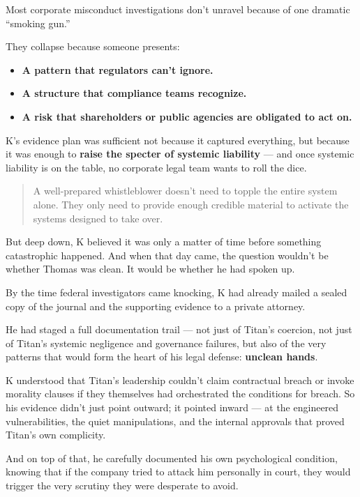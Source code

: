 Most corporate misconduct investigations don’t unravel because of one dramatic “smoking gun.”

They collapse because someone presents:

\begin{itemize}
    \item \textbf{A pattern that regulators can’t ignore.}
    \item \textbf{A structure that compliance teams recognize.}
    \item \textbf{A risk that shareholders or public agencies are obligated to act on.}
\end{itemize}

K’s evidence plan was sufficient not because it captured everything,  
but because it was enough to \textbf{raise the specter of systemic liability} —  
and once systemic liability is on the table, no corporate legal team wants to roll the dice.

\begin{quote}
    A well-prepared whistleblower doesn’t need to topple the entire system alone.  
    They only need to provide enough credible material to activate the systems designed to take over.
\end{quote}


But deep down, K believed it was only a matter of time before something catastrophic happened.
And when that day came, the question wouldn’t be whether Thomas was clean.
It would be whether he had spoken up.

By the time federal investigators came knocking,
K had already mailed a sealed copy of the journal and the supporting evidence to a private attorney.

He had staged a full documentation trail —
not just of Titan’s coercion,
not just of Titan’s systemic negligence and governance failures,
but also of the very patterns that would form the heart of his legal defense:
\textbf{unclean hands}.

K understood that Titan’s leadership couldn’t claim contractual breach or invoke morality clauses if they themselves had orchestrated the conditions for breach.
So his evidence didn’t just point outward;
it pointed inward —
at the engineered vulnerabilities, the quiet manipulations, and the internal approvals that proved Titan’s own complicity.

And on top of that,
he carefully documented his own psychological condition,
knowing that if the company tried to attack him personally in court,
they would trigger the very scrutiny they were desperate to avoid.

